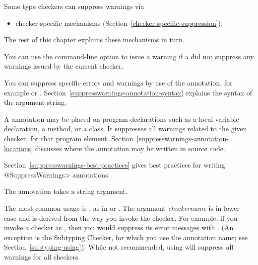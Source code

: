 Some type checkers can suppress warnings via
\begin{itemize}
\item
  checker-specific mechanisms (Section~\ref{checker-specific-suppression}).
\end{itemize}

\noindent
The rest of this chapter explains these mechanisms in turn.

You can use the  command-line option to issue a
warning if a  did not suppress any warnings issued by the current checker.



\begin{sloppypar}
You can suppress specific errors and warnings by use of the
 annotation, for example
 or .
Section~\ref{suppresswarnings-annotation-syntax} explains the syntax of the
argument string.
\end{sloppypar}

A 
annotation may be placed on program declarations such as a local
variable declaration, a method, or a class.  It suppresses all warnings
related to the given checker, for that program element.
Section~\ref{suppresswarnings-annotation-locations} discusses where the
annotation may be written in source code.

Section~\ref{suppresswarnings-best-practices} gives best practices for
writing \<@SuppressWarnings> annotations.



The  annotation takes a string argument.

The most common usage is , as
in  or
.  The argument \emph{checkername} is
in lower case and is derived from the way you invoke the checker.  For
example, if you invoke a checker as
,
then you would suppress its error messages with
.  (An exception is the Subtyping
Checker, for which you use the annotation name; see
Section~\ref{subtyping-using}).  While not recommended, using
 will suppress all warnings for all
checkers.

